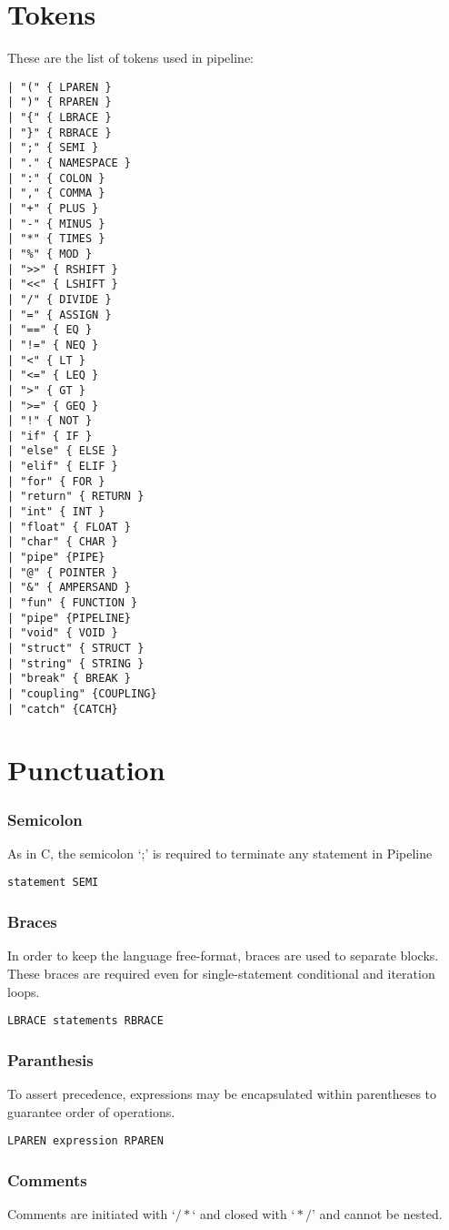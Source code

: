 \documentclass[./LRM_main.tex]{subfiles}
\begin{document}
\section{Tokens}
These are the list of tokens used in pipeline:\\
\begin{lstlisting}
| "(" { LPAREN } 
| ")" { RPAREN } 
| "{" { LBRACE } 
| "}" { RBRACE } 
| ";" { SEMI } 
| "." { NAMESPACE }
| ":" { COLON } 
| "," { COMMA } 
| "+" { PLUS } 
| "-" { MINUS }
| "*" { TIMES } 
| "%" { MOD } 
| ">>" { RSHIFT } 
| "<<" { LSHIFT } 
| "/" { DIVIDE } 
| "=" { ASSIGN } 
| "==" { EQ }
| "!=" { NEQ } 
| "<" { LT } 
| "<=" { LEQ } 
| ">" { GT } 
| ">=" { GEQ } 
| "!" { NOT } 
| "if" { IF } 
| "else" { ELSE } 
| "elif" { ELIF } 
| "for" { FOR } 
| "return" { RETURN } 
| "int" { INT }
| "float" { FLOAT } 
| "char" { CHAR }
| "pipe" {PIPE}
| "@" { POINTER } 
| "&" { AMPERSAND } 
| "fun" { FUNCTION } 
| "pipe" {PIPELINE}
| "void" { VOID } 
| "struct" { STRUCT } 
| "string" { STRING } 
| "break" { BREAK } 
| "coupling" {COUPLING}
| "catch" {CATCH}
\end{lstlisting}


\section{Punctuation}
\subsubsection{Semicolon}
As in C, the semicolon ‘;’ is required to terminate any statement in Pipeline
\begin{lstlisting}
statement SEMI
\end{lstlisting}

\subsubsection{Braces}
In order to keep the language free-format, braces are used to separate blocks. These braces are required even for single-statement conditional and iteration loops. 
\begin{lstlisting}
LBRACE statements RBRACE
\end{lstlisting}

\subsubsection{Paranthesis }
To assert precedence, expressions may be encapsulated within parentheses to guarantee order of operations.
\begin{lstlisting}
LPAREN expression RPAREN
\end{lstlisting}

\subsubsection{Comments }
Comments are initiated with $‘/* ‘$ and closed with $‘*/’$ and cannot be nested.
\end{document}
